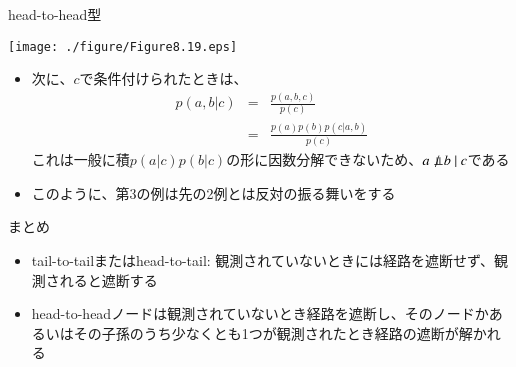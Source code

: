 \begin{frame}{head-to-head型}
 \begin{center}
  \texttt{[image: ./figure/Figure8.19.eps]}
 \end{center}
 \begin{itemize}
  \item 次に、$c$で条件付けられたときは、
        \begin{eqnarray*}
         p(a,b|c) &=& \frac{p(a,b,c)}{p(c)}\\
         &= & \frac{p(a)p(b)p(c|a,b)}{p(c)}
        \end{eqnarray*}
        これは一般に積$p(a|c)p(b|c)$の形に因数分解できないため、$a \nPerp \ b \ | \ c$である
  \item このように、第3の例は先の2例とは反対の振る舞いをする
 \end{itemize}
\end{frame}

\begin{frame}{まとめ}
 \begin{itemize}
  \item tail-to-tailまたはhead-to-tail: 観測されていないときには経路を遮断せず、観測されると遮断する
  \item head-to-headノードは観測されていないとき経路を遮断し、そのノードかあるいはその子孫のうち少なくとも1つが観測されたとき経路の遮断が解かれる
 \end{itemize}
\end{frame}

